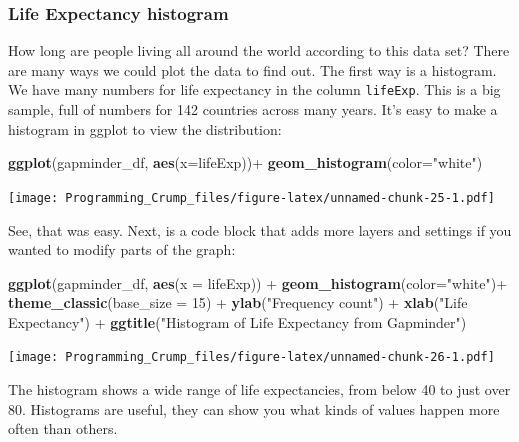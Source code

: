 \documentclass[]{book}
\newenvironment{Shaded}{\begin{snugshade}}{\end{snugshade}}
\newcommand{\KeywordTok}[1]{\textcolor[rgb]{0.13,0.29,0.53}{\textbf{{#1}}}}
\newcommand{\DataTypeTok}[1]{\textcolor[rgb]{0.13,0.29,0.53}{{#1}}}
\newcommand{\DecValTok}[1]{\textcolor[rgb]{0.00,0.00,0.81}{{#1}}}
\newcommand{\StringTok}[1]{\textcolor[rgb]{0.31,0.60,0.02}{{#1}}}
\newcommand{\NormalTok}[1]{{#1}}
\theoremstyle{definition}
\theoremstyle{definition}
\theoremstyle{definition}
\theoremstyle{remark}
\begin{document}
\subsubsection{Life Expectancy
histogram}\label{life-expectancy-histogram}

How long are people living all around the world according to this data
set? There are many ways we could plot the data to find out. The first
way is a histogram. We have many numbers for life expectancy in the
column \texttt{lifeExp}. This is a big sample, full of numbers for 142
countries across many years. It's easy to make a histogram in ggplot to
view the distribution:

\begin{Shaded}
\begin{Highlighting}[]
\KeywordTok{ggplot}\NormalTok{(gapminder_df, }\KeywordTok{aes}\NormalTok{(}\DataTypeTok{x=}\NormalTok{lifeExp))+}
\StringTok{  }\KeywordTok{geom_histogram}\NormalTok{(}\DataTypeTok{color=}\StringTok{"white"}\NormalTok{)}
\end{Highlighting}
\end{Shaded}

\texttt{[image: Programming\_Crump\_files/figure-latex/unnamed-chunk-25-1.pdf]}

See, that was easy. Next, is a code block that adds more layers and
settings if you wanted to modify parts of the graph:

\begin{Shaded}
\begin{Highlighting}[]
\KeywordTok{ggplot}\NormalTok{(gapminder_df, }\KeywordTok{aes}\NormalTok{(}\DataTypeTok{x =} \NormalTok{lifeExp)) +}
\StringTok{  }\KeywordTok{geom_histogram}\NormalTok{(}\DataTypeTok{color=}\StringTok{"white"}\NormalTok{)+}\StringTok{ }
\StringTok{  }\KeywordTok{theme_classic}\NormalTok{(}\DataTypeTok{base_size =} \DecValTok{15}\NormalTok{) +}
\StringTok{  }\KeywordTok{ylab}\NormalTok{(}\StringTok{"Frequency count"}\NormalTok{) +}\StringTok{ }
\StringTok{  }\KeywordTok{xlab}\NormalTok{(}\StringTok{"Life Expectancy"}\NormalTok{) +}
\StringTok{  }\KeywordTok{ggtitle}\NormalTok{(}\StringTok{"Histogram of Life Expectancy from Gapminder"}\NormalTok{)}
\end{Highlighting}
\end{Shaded}

\texttt{[image: Programming\_Crump\_files/figure-latex/unnamed-chunk-26-1.pdf]}

The histogram shows a wide range of life expectancies, from below 40 to
just over 80. Histograms are useful, they can show you what kinds of
values happen more often than others.
\end{document}
